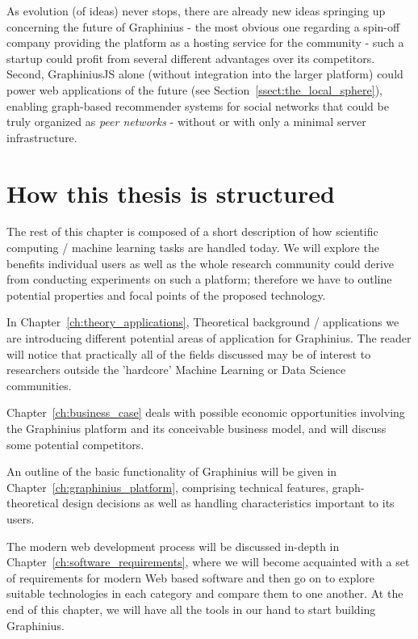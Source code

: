 As evolution (of ideas) never stops, there are already new ideas springing up concerning the future of Graphinius - the most obvious one regarding a spin-off company providing the platform as a hosting service for the community - such a startup could profit from several different advantages over its competitors. Second, GraphiniusJS alone (without integration into the larger platform) could power web applications of the future (see Section~\ref{ssect:the_local_sphere}), enabling graph-based recommender systems for social networks that could be truly organized as \textit{peer networks} - without or with only a minimal server infrastructure.


\section{How this thesis is structured}
\label{section:thesis_structure}

The rest of this chapter is composed of a short description of how scientific computing / machine learning tasks are handled today. We will explore the benefits individual users as well as the whole research community could derive from conducting experiments on such a platform; therefore we have to outline potential properties and focal points of the proposed technology.

In Chapter~\ref{ch:theory_applications}, Theoretical background / applications we are introducing different potential areas of application for Graphinius. The reader will notice that practically all of the fields discussed may be of interest to researchers outside the 'hardcore' Machine Learning or Data Science communities.

Chapter~\ref{ch:business_case} deals with possible economic opportunities involving the Graphinius platform and its conceivable business model, and will discuss some potential competitors.

An outline of the basic functionality of Graphinius will be given in Chapter~\ref{ch:graphinius_platform}, comprising technical features, graph-theoretical design decisions as well as handling characteristics important to its users.

The modern web development process will be discussed in-depth in Chapter~\ref{ch:software_requirements}, where we will become acquainted with a set of requirements for modern Web based software and then go on to explore suitable technologies in each category and compare them to one another. At the end of this chapter, we will have all the tools in our hand to start building Graphinius.

